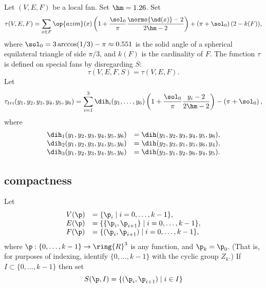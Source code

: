 \begin{definition}\label{def:tau}
Let $(V,E,F)$ be a local fan.  Set $\hm = 1.26$.  Set
\begin{displaymath}
  \tau(V,E,F) =\sum_{x\in F} \op{azim}(x)\left(1 + \dfrac{\sol_0}{\pi}  
    \dfrac{\normo{\nd(x)}-2}{2\hm-2}\right) 
+ \left(\pi+{\sol_0}\right) (2- k(F)),
\end{displaymath}
where $\sol_0=3\arccos(1/3)-\pi\approx0.551$ is the solid angle of a
spherical equilateral triangle of side $\pi/3$, and $k(F)$ is the
cardinality of $F$.  The function $\tau$ is defined on special fans by
disregarding $S$:
\begin{displaymath}
\tau(V,E,F,S) = \tau(V,E,F).
\end{displaymath}
Let 
\begin{displaymath}
  \tau_{tri}(y_1,y_2,y_3,y_4,y_5,y_6) =
  \sum_{i=1}^3 \dih_i(y_1,\ldots,y_6)
\left(1 + \dfrac{\sol_0}{\pi}  \dfrac{y_i -2}{2\hm-2}\right) 
- \left(\pi+{\sol_0}\right),
\end{displaymath}
where
\begin{displaymath}
\begin{array}{lll}
\dih_1(y_1,y_2,y_3,y_4,y_5,y_6) &= \dih(y_1,y_2,y_3,y_4,y_5,y_6),\\
\dih_2(y_1,y_2,y_3,y_4,y_5,y_6) &= \dih(y_2,y_3,y_1,y_5,y_6,y_4),\\
\dih_3(y_1,y_2,y_3,y_4,y_5,y_6) &= \dih(y_3,y_1,y_2,y_6,y_4,y_5).\\
\end{array}
\end{displaymath}
\end{definition}



\subsection{compactness}

Let 
\begin{displaymath}
\begin{array}{lll}
V(\p) &= \{\p_{i}\mid i=0,\ldots,k-1\},\\
E(\p) &= \{\{\p_{i},\p_{i+1}\}\mid i=0,\ldots,k-1\},\\
F(\p) &= \{(\p_{i},\p_{i+1}) \mid i=0,\ldots,k-1\},\\
\end{array}
\end{displaymath}
where $\p:\{0,\ldots,k-1\}\to \ring{R}^3$ is any function, and $\p_k =
\p_0$.  (That is, for purposes of indexing, identify
$\{0,\ldots,k-1\}$ with the cyclic group $Z_k$.)  If
$I\subset\{0,\ldots,k-1\}$ then set
\begin{displaymath}S(\p,I) = \{(\p_i ,\p_{i+1}) \mid i\in
I\}\end{displaymath}

